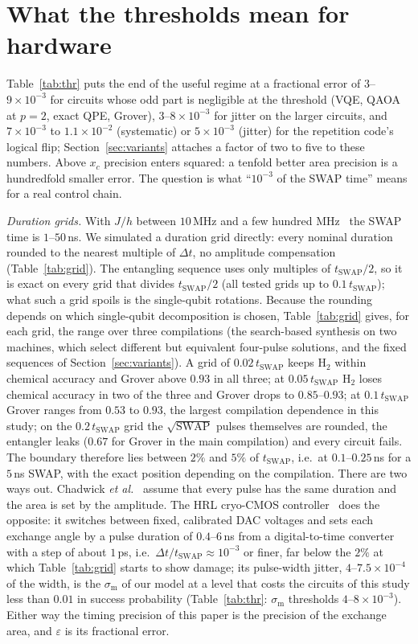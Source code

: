 \documentclass[reprint,aps,pra,amsmath,amssymb,superscriptaddress,letterpaper]{revtex4-2}
\newcommand{\Hz}{\mathrm{H}_2}
\newcommand{\tsw}{t_{\mathrm{SWAP}}}
\begin{document}
\section{What the thresholds mean for hardware}
\label{sec:hardware}

Table~\ref{tab:thr} puts the end of the useful regime at a fractional error of
$3$--$9\times10^{-3}$ for circuits whose odd part is negligible at the
threshold (VQE, QAOA at $p=2$, exact QPE, Grover), $3$--$8\times10^{-3}$ for jitter on the larger circuits, and $7\times10^{-3}$ to $1.1\times10^{-2}$
(systematic) or $5\times10^{-3}$ (jitter) for the repetition code's logical
flip; Section~\ref{sec:variants} attaches a factor of two to five to these numbers.
Above $x_c$ precision enters squared: a tenfold better area precision is a
hundredfold smaller error. The question is what ``$10^{-3}$ of the SWAP
time'' means for a real control chain.

\emph{Duration grids.} With $J/h$ between $10$\,MHz and a few hundred MHz~\cite{andrews2019,weinstein2023} the SWAP time is $1$--$50$\,ns.
We simulated a duration grid directly: every nominal duration rounded to the
nearest multiple of $\Delta t$, no amplitude compensation
(Table~\ref{tab:grid}). The entangling sequence uses only multiples of
$\tsw/2$, so it is exact on every grid that divides $\tsw/2$ (all tested grids
up to $0.1\,\tsw$); what such a grid spoils is the single-qubit rotations. Because the rounding depends on which single-qubit decomposition is chosen, Table~\ref{tab:grid} gives, for each grid, the range over three compilations (the search-based synthesis on two machines, which select different but equivalent four-pulse solutions, and the fixed sequences of Section~\ref{sec:variants}). A grid of $0.02\,\tsw$ keeps $\Hz$ within chemical accuracy and Grover above $0.93$ in all three; at $0.05\,\tsw$ $\Hz$ loses chemical accuracy in two of the three and Grover drops to $0.85$--$0.93$; at $0.1\,\tsw$ Grover ranges from $0.53$ to $0.93$, the largest compilation dependence in this study; on the $0.2\,\tsw$ grid the $\sqrt{\mathrm{SWAP}}$ pulses themselves are rounded, the entangler leaks ($0.67$ for Grover in the main compilation) and every circuit fails. The boundary therefore lies between $2\%$ and $5\%$ of $\tsw$, i.e.\ at $0.1$--$0.25$\,ns for a $5$\,ns SWAP, with the exact position depending on the compilation. There are two ways out. Chadwick \emph{et al.}~\cite{chadwick2024} assume that every pulse has the same duration and the area is set by the amplitude. The HRL cryo-CMOS controller~\cite{hrl2026} does the opposite: it switches between fixed, calibrated DAC voltages and sets each exchange angle by a pulse duration of $0.4$--$6$\,ns from a digital-to-time converter with a step of about $1$\,ps, i.e.\ $\Delta t/\tsw\approx10^{-3}$ or finer, far below the $2\%$ at which Table~\ref{tab:grid} starts to show damage; its pulse-width jitter, $4$--$7.5\times10^{-4}$ of the width, is the $\sigma_{\mathrm m}$ of our model at a level that costs the circuits of this study less than $0.01$ in success probability (Table~\ref{tab:thr}: $\sigma_{\mathrm m}$ thresholds $4$--$8\times10^{-3}$). Either way the timing precision of this paper is the precision of the exchange area, and $\varepsilon$ is its fractional error.
\end{document}
